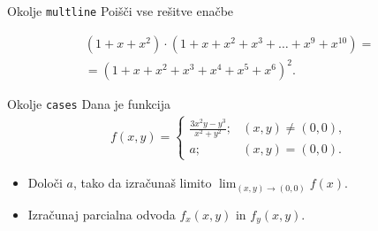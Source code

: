 \begin{frame}{Okolje \texttt{multline}}
	Poišči vse rešitve enačbe
	
	
	\begin{multline*}
		(1+x+x^2) \cdot (1+x+x^2+x^3+\ldots+x^9+x^{10}) = \\
		=(1+x+x^2+x^3+x^4+x^5+x^6)^2.
	\end{multline*}
	
\end{frame}

\begin{frame}{Okolje \texttt{cases}}
	Dana je funkcija
		\begin{align*}
			f(x, y) = \begin{cases}\frac{3x^2y-y^3}{x^2+y^2}; & (x, y) \neq (0, 0), \\
				a; & (x, y) = (0, 0).
						\end{cases} 
		\end{align*}
		
	\begin{itemize}
	\item Določi $a$, tako da izračunaš limito \( \lim_{(x,y)\to(0,0)} f(x). \)
	\item Izračunaj parcialna odvoda $f_x(x,y)$ in $f_y(x,y)$.
	\end{itemize}
\end{frame}
